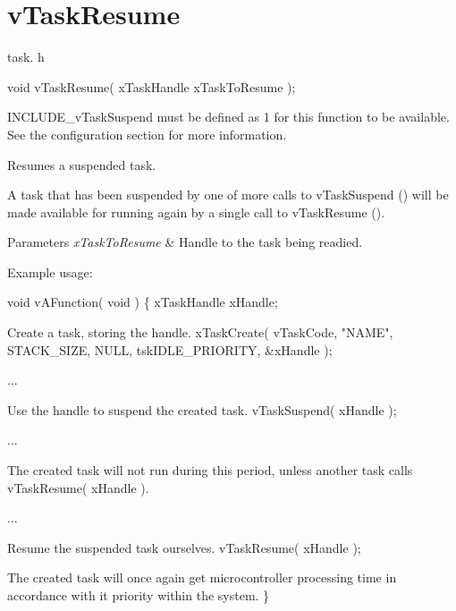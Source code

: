 \hypertarget{group__v_task_resume}{\section{v\-Task\-Resume}
\label{group__v_task_resume}
}
task. h 
\begin{DoxyPre}void vTaskResume( xTaskHandle xTaskToResume );\end{DoxyPre}


I\-N\-C\-L\-U\-D\-E\-\_\-v\-Task\-Suspend must be defined as 1 for this function to be available. See the configuration section for more information.

Resumes a suspended task.

A task that has been suspended by one of more calls to v\-Task\-Suspend () will be made available for running again by a single call to v\-Task\-Resume ().


\begin{DoxyParams}{Parameters}
{\em x\-Task\-To\-Resume} & Handle to the task being readied.\\
\hline
\end{DoxyParams}
Example usage\-: 
\begin{DoxyPre}
 void vAFunction( void )
 \{
 xTaskHandle xHandle;\end{DoxyPre}



\begin{DoxyPre}Create a task, storing the handle.
         xTaskCreate( vTaskCode, "NAME", STACK\_SIZE, NULL, tskIDLE\_PRIORITY, \&xHandle );\end{DoxyPre}



\begin{DoxyPre}...\end{DoxyPre}



\begin{DoxyPre}Use the handle to suspend the created task.
         vTaskSuspend( xHandle );\end{DoxyPre}



\begin{DoxyPre}...\end{DoxyPre}



\begin{DoxyPre}The created task will not run during this period, unless
another task calls vTaskResume( xHandle ).\end{DoxyPre}



\begin{DoxyPre}...\end{DoxyPre}



\begin{DoxyPre}Resume the suspended task ourselves.
         vTaskResume( xHandle );\end{DoxyPre}



\begin{DoxyPre}The created task will once again get microcontroller processing
time in accordance with it priority within the system.
 \}
   \end{DoxyPre}
 